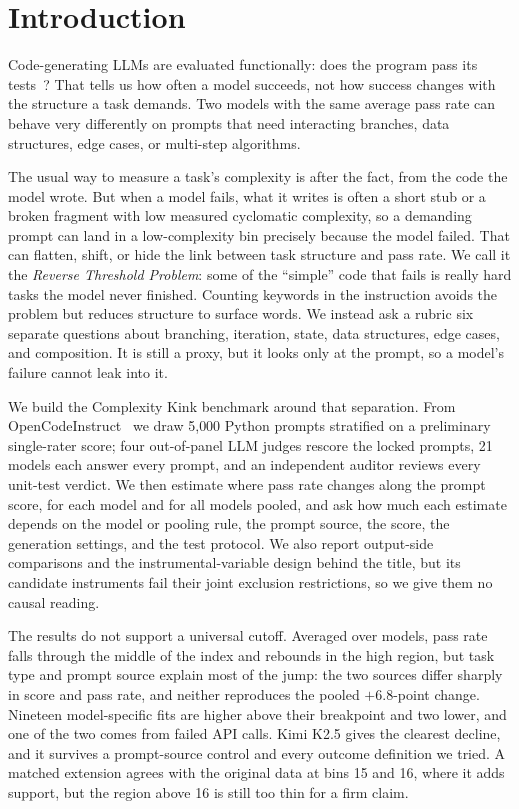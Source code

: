 \documentclass{article}
\begin{document}
\section{Introduction}

Code-generating LLMs are evaluated functionally: does the program pass its tests~\cite{chen2021evaluating,austin2021program,jimenez2023swebench}? That tells us how often a model succeeds, not how success changes with the structure a task demands. Two models with the same average pass rate can behave very differently on prompts that need interacting branches, data structures, edge cases, or multi-step algorithms.

The usual way to measure a task's complexity is after the fact, from the code the model wrote. But when a model fails, what it writes is often a short stub or a broken fragment with low measured cyclomatic complexity, so a demanding prompt can land in a low-complexity bin precisely because the model failed. That can flatten, shift, or hide the link between task structure and pass rate. We call it the \emph{Reverse Threshold Problem}: some of the ``simple'' code that fails is really hard tasks the model never finished. Counting keywords in the instruction avoids the problem but reduces structure to surface words. We instead ask a rubric six separate questions about branching, iteration, state, data structures, edge cases, and composition. It is still a proxy, but it looks only at the prompt, so a model's failure cannot leak into it.

We build the Complexity Kink benchmark around that separation. From OpenCodeInstruct~\cite{opencodeinst} we draw 5{,}000 Python prompts stratified on a preliminary single-rater score; four out-of-panel LLM judges rescore the locked prompts, 21 models each answer every prompt, and an independent auditor reviews every unit-test verdict. We then estimate where pass rate changes along the prompt score, for each model and for all models pooled, and ask how much each estimate depends on the model or pooling rule, the prompt source, the score, the generation settings, and the test protocol. We also report output-side comparisons and the instrumental-variable design behind the title, but its candidate instruments fail their joint exclusion restrictions, so we give them no causal reading.

The results do not support a universal cutoff. Averaged over models, pass rate falls through the middle of the index and rebounds in the high region, but task type and prompt source explain most of the jump: the two sources differ sharply in score and pass rate, and neither reproduces the pooled $+6.8$-point change. Nineteen model-specific fits are higher above their breakpoint and two lower, and one of the two comes from failed API calls. Kimi K2.5 gives the clearest decline, and it survives a prompt-source control and every outcome definition we tried. A matched extension agrees with the original data at bins 15 and 16, where it adds support, but the region above 16 is still too thin for a firm claim.
\end{document}
